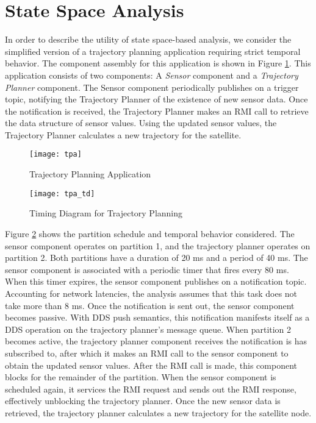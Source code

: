 \section{State Space Analysis}
\label{sec:State_Space_Analysis}

In order to describe the utility of state space-based analysis, we consider the simplified version of a trajectory planning application requiring strict temporal behavior. The component assembly for this application is shown in Figure \ref{fig:tpa}. This application consists of two components: A \emph{Sensor} component and a \emph{Trajectory Planner} component. The Sensor component periodically publishes on a trigger topic, notifying the Trajectory Planner of the existence of new sensor data. Once the notification is received, the Trajectory Planner makes an RMI call to retrieve the data structure of sensor values. Using the updated sensor values, the Trajectory Planner calculates a new trajectory for the satellite. 

\begin{figure}[ht]
\centering
\texttt{[image: tpa]}
\caption{Trajectory Planning Application}
\label{fig:tpa}
\vspace{-0.2in}
\end{figure}

\begin{figure}[ht]
\centering
\texttt{[image: tpa\_td]}
\caption{Timing Diagram for Trajectory Planning}
\label{fig:tpa_td}
\vspace{-0.2in}
\end{figure}
\vspace{0.1in}

Figure \ref{fig:tpa_td} shows the partition schedule and temporal behavior considered. The sensor component operates on partition 1, and the trajectory planner operates on partition 2. Both partitions have a duration of 20 ms and a period of 40 ms. The sensor component is associated with a periodic timer that fires every 80 ms. When this timer expires, the sensor component publishes on a notification topic. Accounting for network latencies, the analysis assumes that this task does not take more than 8 ms. Once the notification is sent out, the sensor component becomes passive. With DDS push semantics, this notification manifests itself as a DDS operation on the trajectory planner's message queue. When partition 2 becomes active, the trajectory planner component receives the notification is has subscribed to, after which it makes an RMI call to the sensor component to obtain the updated sensor values. After the RMI call is made, this component blocks for the remainder of the partition. When the sensor component is scheduled again, it services the RMI request and sends out the RMI response, effectively unblocking the trajectory planner. Once the new sensor data is retrieved, the trajectory planner calculates a new trajectory for the satellite node. %

